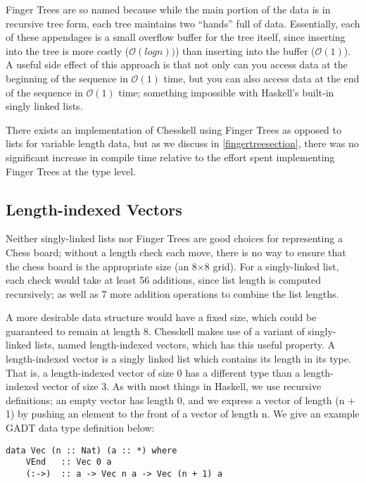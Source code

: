 Finger Trees are so named because while the main portion of the data is in recursive tree form, each tree maintains two ``hands'' full of data. Essentially, each of these appendages is a small overflow buffer for the tree itself, since inserting into the tree is more costly ($\mathcal{O}(log n))$) than inserting into the buffer ($\mathcal{O}(1)$). A useful side effect of this approach is that not only can you access data at the beginning of the sequence in $\mathcal{O}(1)$ time, but you can also access data at the end of the sequence in $\mathcal{O}(1)$ time; something impossible with Haskell's built-in singly linked lists.

There exists an implementation of Chesskell using Finger Trees as opposed to lists for variable length data, but as we discuss in \cref{fingertreesection}, there was no significant increase in compile time relative to the effort spent implementing Finger Trees at the type level.

\subsection{Length-indexed Vectors} \label{lengthindexedvectors}

Neither singly-linked lists nor Finger Trees are good choices for representing a Chess board; without a length check each move, there is no way to ensure that the chess board is the appropriate size (an 8×8 grid). For a singly-linked list, each check would take at least 56 additions, since list length is computed recursively; as well as 7 more addition operations to combine the list lengths.

A more desirable data structure would have a fixed size, which could be guaranteed to remain at length 8. Chesskell makes use of a variant of singly-linked lists, named length-indexed vectors, which has this useful property. A length-indexed vector is a singly linked list which contains its length in its type. That is, a length-indexed vector of size 0 has a different type than a length-indexed vector of size 3. As with most things in Haskell, we use recursive definitions; an empty vector has length 0, and we express a vector of length (n + 1) by pushing an element to the front of a vector of length n. We give an example GADT data type definition below:

\begin{lstlisting}
data Vec (n :: Nat) (a :: *) where
    VEnd   :: Vec 0 a
    (:->)  :: a -> Vec n a -> Vec (n + 1) a
\end{lstlisting}

